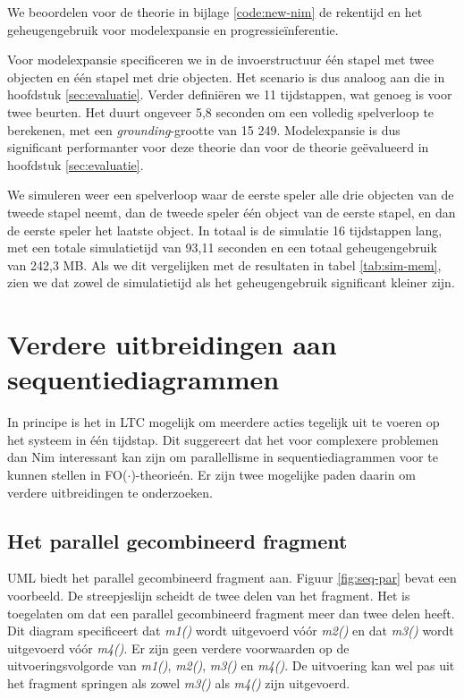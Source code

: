 We beoordelen voor de theorie in bijlage \ref{code:new-nim} de rekentijd en het geheugengebruik voor modelexpansie en progressie\"inferentie.

Voor modelexpansie specificeren we in de invoerstructuur \'e\'en stapel met twee objecten en \'e\'en stapel met drie objecten. Het scenario is dus analoog aan die in hoofdstuk \ref{sec:evaluatie}. Verder defini\"eren we 11 tijdstappen, wat genoeg is voor twee beurten. Het duurt ongeveer 5,8 seconden om een volledig spelverloop te berekenen, met een \textit{grounding}-grootte van 15 249. Modelexpansie is dus significant performanter voor deze theorie dan voor de theorie ge\"evalueerd in hoofdstuk \ref{sec:evaluatie}.

We simuleren weer een spelverloop waar de eerste speler alle drie objecten van de tweede stapel neemt, dan de tweede speler \'e\'en object van de eerste stapel, en dan de eerste speler het laatste object. In totaal is de simulatie 16 tijdstappen lang, met een totale simulatietijd van 93,11 seconden en een totaal geheugengebruik van 242,3 MB. Als we dit vergelijken met de resultaten in tabel \ref{tab:sim-mem}, zien we dat zowel de simulatietijd als het geheugengebruik significant kleiner zijn.

\section{Verdere uitbreidingen aan sequentiediagrammen}

In principe is het in LTC mogelijk om meerdere acties tegelijk uit te voeren op het systeem in \'e\'en tijdstap. Dit suggereert dat het voor complexere problemen dan Nim interessant kan zijn om parallellisme in sequentiediagrammen voor te kunnen stellen in FO($\cdot$)-theorie\'en. Er zijn twee mogelijke paden daarin om verdere uitbreidingen te onderzoeken.

\subsection{Het parallel gecombineerd fragment}

UML biedt het parallel gecombineerd fragment aan. Figuur \ref{fig:seq-par} bevat een voorbeeld. De streepjeslijn scheidt de twee delen van het fragment. Het is toegelaten om dat een parallel gecombineerd fragment meer dan twee delen heeft. Dit diagram specificeert dat \textit{m1()} wordt uitgevoerd v\'o\'or \textit{m2()} en dat \textit{m3()} wordt uitgevoerd v\'o\'or \textit{m4()}. Er zijn geen verdere voorwaarden op de uitvoeringsvolgorde van \textit{m1()}, \textit{m2()}, \textit{m3()} en \textit{m4()}. De uitvoering kan wel pas uit het fragment springen als zowel \textit{m3()} als \textit{m4()} zijn uitgevoerd.

